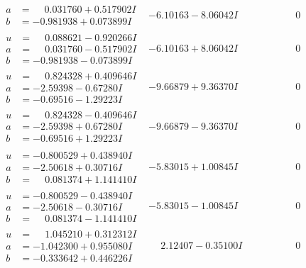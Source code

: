 \documentclass[1p]{elsarticle_modified}
\theoremstyle{definition}
\begin{document}
$$\begin{array}{c|c|c}
\begin{aligned}
a &= \phantom{-}0.031760 + 0.517902 I \\
b &= -0.981938 + 0.073899 I\end{aligned}
 & -6.10163 - 8.06042 I & \phantom{-0.000000 } 0 \\ \hline\begin{aligned}
u &= \phantom{-}0.088621 - 0.920266 I \\
a &= \phantom{-}0.031760 - 0.517902 I \\
b &= -0.981938 - 0.073899 I\end{aligned}
 & -6.10163 + 8.06042 I & \phantom{-0.000000 } 0 \\ \hline\begin{aligned}
u &= \phantom{-}0.824328 + 0.409646 I \\
a &= -2.59398 - 0.67280 I \\
b &= -0.69516 - 1.29223 I\end{aligned}
 & -9.66879 + 9.36370 I & \phantom{-0.000000 } 0 \\ \hline\begin{aligned}
u &= \phantom{-}0.824328 - 0.409646 I \\
a &= -2.59398 + 0.67280 I \\
b &= -0.69516 + 1.29223 I\end{aligned}
 & -9.66879 - 9.36370 I & \phantom{-0.000000 } 0 \\ \hline\begin{aligned}
u &= -0.800529 + 0.438940 I \\
a &= -2.50618 + 0.30716 I \\
b &= \phantom{-}0.081374 + 1.141410 I\end{aligned}
 & -5.83015 + 1.00845 I & \phantom{-0.000000 } 0 \\ \hline\begin{aligned}
u &= -0.800529 - 0.438940 I \\
a &= -2.50618 - 0.30716 I \\
b &= \phantom{-}0.081374 - 1.141410 I\end{aligned}
 & -5.83015 - 1.00845 I & \phantom{-0.000000 } 0 \\ \hline\begin{aligned}
u &= \phantom{-}1.045210 + 0.312312 I \\
a &= -1.042300 + 0.955080 I \\
b &= -0.333642 + 0.446226 I\end{aligned}
 & \phantom{-}2.12407 - 0.35100 I & \phantom{-0.000000 } 0 \\ \hline\begin{aligned}

\end{aligned}
\end{array}$$
\end{document}
